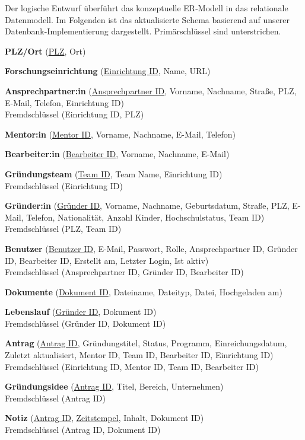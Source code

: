 \documentclass{article}
\begin{document}
Der logische Entwurf überführt das konzeptuelle ER-Modell in das relationale Datenmodell. Im Folgenden ist das aktualisierte Schema basierend auf unserer Datenbank-Implementierung dargestellt. Primärschlüssel sind unterstrichen.

\textbf{PLZ/Ort} (\underline{PLZ}, Ort)

\textbf{Forschungseinrichtung} (\underline{Einrichtung ID}, Name, URL)

\textbf{Ansprechpartner:in} (\underline{Ansprechpartner ID}, Vorname, Nachname, Straße, PLZ, E-Mail, Telefon, Einrichtung ID)\\
Fremdschlüssel (Einrichtung ID, PLZ)

\textbf{Mentor:in} (\underline{Mentor ID}, Vorname, Nachname, E-Mail, Telefon)

\textbf{Bearbeiter:in} (\underline{Bearbeiter ID}, Vorname, Nachname, E-Mail)

\textbf{Gründungsteam} (\underline{Team ID}, Team Name, Einrichtung ID)\\
Fremdschlüssel (Einrichtung ID)

\textbf{Gründer:in} (\underline{Gründer ID}, Vorname, Nachname, Geburtsdatum, Straße, PLZ, E-Mail, Telefon, Nationalität, Anzahl Kinder, Hochschulstatus, Team ID)\\
Fremdschlüssel (PLZ, Team ID)

\textbf{Benutzer} (\underline{Benutzer ID}, E-Mail, Passwort, Rolle, Ansprechpartner ID, Gründer ID, Bearbeiter ID, Erstellt am, Letzter Login, Ist aktiv)\\
Fremdschlüssel (Ansprechpartner ID, Gründer ID, Bearbeiter ID)

\textbf{Dokumente} (\underline{Dokument ID}, Dateiname, Dateityp, Datei, Hochgeladen am)

\textbf{Lebenslauf} (\underline{Gründer ID}, Dokument ID)\\
Fremdschlüssel (Gründer ID, Dokument ID)

\textbf{Antrag} (\underline{Antrag ID}, Gründungstitel, Status, Programm, Einreichungsdatum, Zuletzt aktualisiert, Mentor ID, Team ID, Bearbeiter ID, Einrichtung ID)\\
Fremdschlüssel (Einrichtung ID, Mentor ID, Team ID, Bearbeiter ID)

\textbf{Gründungsidee} (\underline{Antrag ID}, Titel, Bereich, Unternehmen)\\
Fremdschlüssel (Antrag ID)

\textbf{Notiz} (\underline{Antrag ID}, \underline{Zeitstempel}, Inhalt, Dokument ID)\\
Fremdschlüssel (Antrag ID, Dokument ID)
\end{document}
